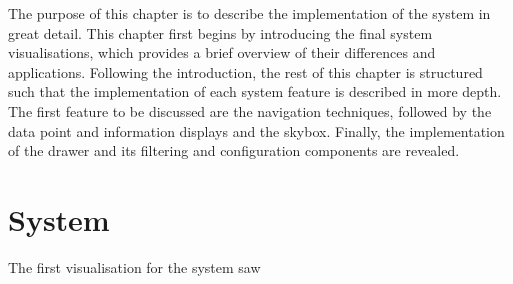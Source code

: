 
The purpose of this chapter is to describe the implementation of the system in great detail. This chapter first begins by introducing the final system visualisations, which provides a brief overview of their differences and applications. Following the introduction, the rest of this chapter is structured such that the implementation of each system feature is described in more depth. The first feature to be discussed are the navigation techniques, followed by the data point and information displays and the skybox. Finally, the implementation of the drawer and its filtering and configuration components are revealed.

\section{System} {
\label{sec:system}

	The first visualisation for the system saw 

	

	


	

	
}


